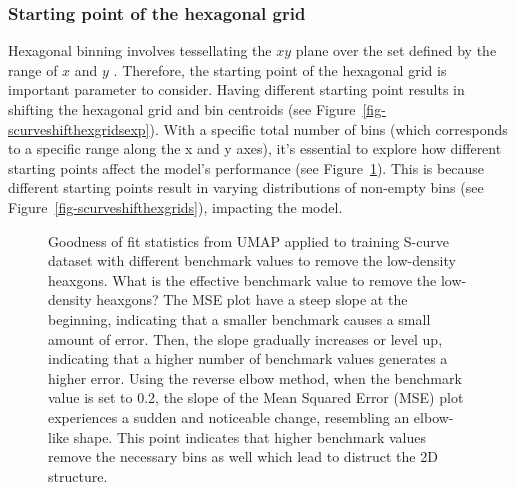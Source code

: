 \documentclass[
  12pt]{article}
\begin{document}
\subsubsection{Starting point of the hexagonal
grid}\label{starting-point-of-the-hexagonal-grid}

Hexagonal binning involves tessellating the \(xy\) plane over the set
defined by the range of \(x\) and \(y\) \citep{Dan2023}. Therefore, the
starting point of the hexagonal grid is important parameter to consider.
Having different starting point results in shifting the hexagonal grid
and bin centroids (see Figure~\ref{fig-scurveshifthexgridsexp}). With a
specific total number of bins (which corresponds to a specific range
along the x and y axes), it's essential to explore how different
starting points affect the model's performance (see
Figure~\ref{fig-mseScurvestartpoint}). This is because different
starting points result in varying distributions of non-empty bins (see
Figure~\ref{fig-scurveshifthexgrids}), impacting the model.

\begin{figure}[H]


\caption{\label{fig-mseScurvestartpoint}Goodness of fit statistics from
UMAP applied to training S-curve dataset with different benchmark values
to remove the low-density heaxgons. What is the effective benchmark
value to remove the low-density heaxgons? The MSE plot have a steep
slope at the beginning, indicating that a smaller benchmark causes a
small amount of error. Then, the slope gradually increases or level up,
indicating that a higher number of benchmark values generates a higher
error. Using the reverse elbow method, when the benchmark value is set
to 0.2, the slope of the Mean Squared Error (MSE) plot experiences a
sudden and noticeable change, resembling an elbow-like shape. This point
indicates that higher benchmark values remove the necessary bins as well
which lead to distruct the 2D structure.}

\end{figure}%
\end{document}
